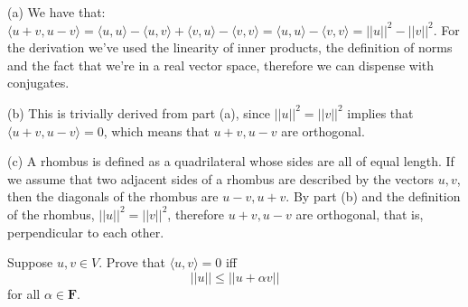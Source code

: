 \begin{solution}

(a) We have that: $\langle u + v, u - v \rangle = \langle u, u \rangle - \langle u, v \rangle + \langle v, u \rangle - \langle v, v \rangle =  \langle u, u \rangle -  \langle v, v \rangle = \lvert \lvert u \rvert \rvert^2 - \lvert \lvert v \rvert \rvert^2$.
For the derivation we've used the linearity of inner products, the definition of norms and the fact that we're in a real vector space, therefore we can dispense with conjugates.

(b) This is trivially derived from part (a), since $\lvert \lvert u \rvert \rvert^2 = \lvert \lvert v \rvert \rvert^2$ implies that  $\langle u + v, u - v \rangle = 0$, which means that $u + v, u - v$ are orthogonal.

(c) A rhombus is defined as a quadrilateral whose sides are all of equal length. If we assume that two adjacent sides of a rhombus are described by the vectors $u, v$, then the diagonals of the rhombus are $u - v, u + v$. By part (b) and the definition of the rhombus, $\lvert \lvert u \rvert \rvert^2 = \lvert \lvert v \rvert \rvert^2$, therefore $u + v, u - v$ are orthogonal, that is, perpendicular to each other.

\end{solution}


\begin{exercise}{6}
Suppose $u, v \in V$. Prove that $\langle u, v \rangle = 0$ iff 
$$\lvert \lvert u \rvert \rvert \leq \lvert \lvert u + \alpha v \rvert \rvert$$
for all $\alpha \in \mathbf{F}$.
\end{exercise}

